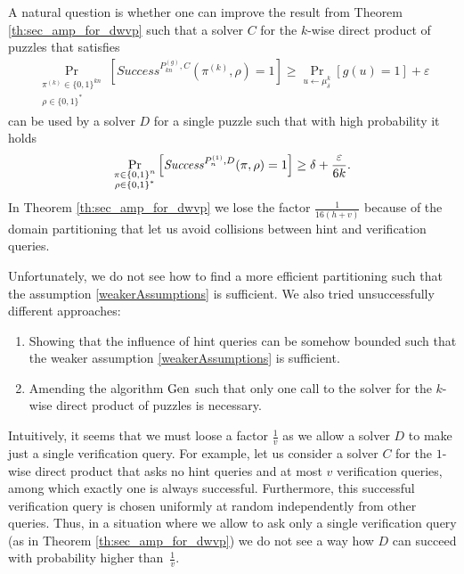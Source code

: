 A natural question is whether one can improve the result from Theorem \ref{th:sec_amp_for_dwvp}
such that a solver $C$ for the $k$-wise direct product of puzzles that satisfies
\begin{align}
    \label{weakerAssumptions}
    \underset{\substack{\pi^{(k)} \in \{0,1\}^{kn} \\ \rho \in \{0,1\}^{*}}}{\Pr}\left[\mathit{Success}^{P_{kn}^{(g)}, C}(\pi^{(k)}, \rho) = 1\right]
    \geq \underset{u \leftarrow \mu_\delta^k}{\Pr}[g(u) = 1] + \varepsilon
\end{align}
can be used by a solver $D$ for a single puzzle such that with high probability it holds
  \begin{align}
    \underset{\substack{\pi \in \{0,1\}^{n} \\ \rho \in \{0,1\}^{*}}}
    {\Pr}\left[\operatorname{\mathit{Success}}^{P_{n}^{(1)},D}(\pi, \rho) = 1\right] \geq \delta + \frac{\varepsilon}{6k}.
  \end{align}
In Theorem \ref{th:sec_amp_for_dwvp} we lose the factor $\frac{1}{16(h+v)}$ because of the domain partitioning that let us avoid collisions between hint and verification queries.

Unfortunately, we do not see how to find a more efficient partitioning such that the assumption \eqref{weakerAssumptions} is sufficient.
We also tried unsuccessfully different approaches:
\begin{enumerate}[-]
  \item Showing that the influence of hint queries can be somehow bounded such that the weaker assumption \eqref{weakerAssumptions} is sufficient.
  \item Amending the algorithm $\operatorname{\text{Gen}}$ such that only one call to the solver for the $k$-wise direct product of puzzles is necessary.
\end{enumerate}

Intuitively, it seems that we must loose a factor $\frac{1}{v}$ as we allow a solver $D$ to make just a single verification query.
For example, let us consider a solver $C$ for the $1$-wise direct product that asks no hint queries and at most $v$ verification queries,
among which exactly one is always successful.
Furthermore, this successful verification query is chosen uniformly at random independently from other queries.
Thus, in a situation where we allow to ask only a single verification query (as in Theorem \ref{th:sec_amp_for_dwvp})
we do not see a way how $D$ can succeed with probability higher than~$\frac{1}{v}$.

